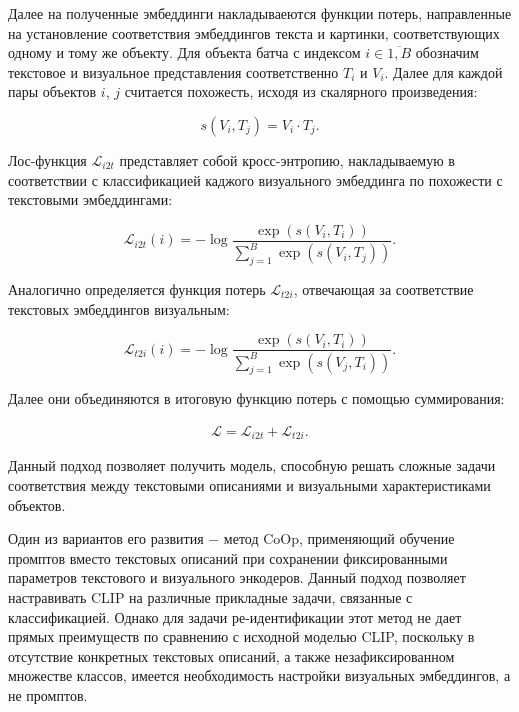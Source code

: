 Далее на полученные эмбеддинги накладываеются функции потерь, направленные на установление соответствия эмбеддингов текста и картинки, соответствующих одному и тому же объекту. Для объекта батча с индексом $i \in \overline{1, B}$ обозначим текстовое и визуальное представления соответственно $T_i$ и $V_i$. Далее для каждой пары объектов $i$, $j$ считается похожесть, исходя из скалярного произведения:

\begin{equation}
	s (V_i, T_j) = V_i \cdot T_j.
\end{equation}

Лос-функция $\mathcal L_{i2t}$ представляет собой кросс-энтропию, накладываемую в соответствии с классификацией каджого визуального эмбеддинга по похожести с текстовыми эмбеддингами:

\begin{equation}
	\mathcal L_{i2t}(i) = - \log \frac{\exp \left( s(V_i, T_i) \right)}{\sum_{j = 1}^B \exp \left( s(V_i, T_j) \right)}.
\end{equation}

Аналогично определяется функция потерь $\mathcal L_{t2i}$, отвечающая за соответствие текстовых эмбеддингов визуальным:

\begin{equation}
	\mathcal L_{t2i}(i) = - \log \frac{\exp \left( s(V_i, T_i) \right)}{\sum_{j = 1}^B \exp \left( s(V_j, T_i) \right)}.
\end{equation}

Далее они объединяются в итоговую функцию потерь с помощью суммирования:

\begin{eqnarray}
	\mathcal L = \mathcal L_{i2t} + \mathcal L_{t2i}.
\end{eqnarray}

Данный подход позволяет получить модель, способную решать сложные задачи соответствия между текстовыми описаниями и визуальными характеристиками объектов. 

Один из вариантов его развития $-$ метод CoOp, применяющий обучение промптов вместо текстовых описаний при сохранении фиксированными параметров текстового и визуального энкодеров. Данный подход позволяет настравивать CLIP на различные прикладные задачи, связанные с классификацией. Однако для задачи ре-идентификации этот метод не дает прямых преимуществ по сравнению с исходной моделью CLIP, поскольку в отсутствие конкретных текстовых описаний, а также незафиксированном множестве классов, имеется необходимость настройки визуальных эмбеддингов, а не промптов.


